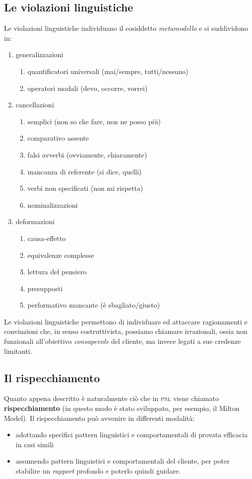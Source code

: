 \subsection{Le violazioni linguistiche}
\label{sub:violazioni}
Le violazioni linguistiche individuano il cosiddetto \emph{metamodello} e si suddividono in:
\begin{enumerate}
\item generalizzazioni
	\begin{enumerate}
	\item quantificatori universali (mai/sempre, tutti/nessuno)
	\item operatori modali (devo, occorre, vorrei)
	\end{enumerate}
\item cancellazioni
	\begin{enumerate}
	\item semplici (non so che fare, non ne posso più)
	\item comparativo assente
	\item falsi avverbi (ovviamente, chiaramente)
	\item mancanza di referente (si dice, quelli)
	\item verbi non specificati (non mi rispetta)
	\item {}nominalizzazioni	
	\end{enumerate}
\item deformazioni
	\begin{enumerate}
	\item causa-effetto
	\item equivalenze complesse
	\item lettura del pensiero
	\item presupposti
	\item performativo mancante (è sbagliato/giusto)
	\end{enumerate}
\end{enumerate}

\noindent Le violazioni linguistiche permettono di individuare ed attaccare ragionamenti e convinzioni che, in senso costruttivista, possiamo chiamare irrazionali, ossia non funzionali  all'obiettivo \emph{consapevole} del cliente, ma invece legati a sue credenze limitanti.

\subsection{Il rispecchiamento}
\label{sub:rispecchiamento}
Quanto appena descritto è naturalmente ciò che in \textsc{pnl} viene chiamato \textbf{rispecchiamento} (in questo modo è stato sviluppato, per esempio, il Milton Model). Il rispecchiamento può avvenire in differenti modalità:
\begin{itemize}
\item adottando specifici pattern linguistici e comportamentali di provata efficacia in casi simili
\item assumendo pattern linguistici e comportamentali del cliente, per poter stabilire un \textit{rapport} profondo e poterlo quindi guidare. 
\end{itemize}

